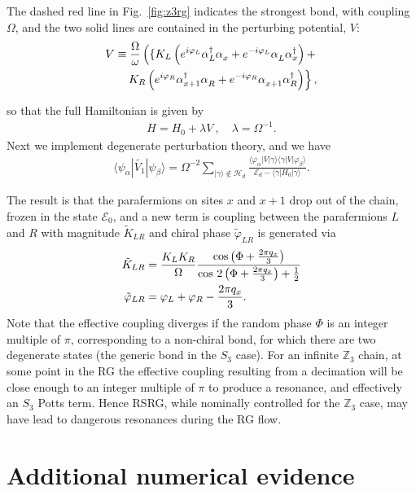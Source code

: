 \documentclass[prb,aps, twocolumn, superscriptaddress]{revtex4-1}
\newcommand{\be}{\begin{eqnarray}}
\newcommand{\ee}{\end{eqnarray}}
\newcommand{\matel}[3]{\langle #1 | #2 | #3 \rangle}
\newcommand{\pfC}[0]{\alpha^{\vphantom{\dagger}}}
\newcommand{\pfCconj}[0]{\alpha^{\dagger}}
\def\ket#1{{|#1\rangle}}
\begin{document}
\begin{appendix}
The dashed red line in Fig.~\ref{fig:z3rg} indicates the strongest bond, with coupling $\Omega$, and the two solid lines are contained in the perturbing potential, $V$: 
\begin{align} V \equiv \frac{\Omega}{\omega} \left(\{ K_L \left(e^{i \varphi_L} \pfCconj_L \pfC_x +  e^{- i \varphi_L}  \pfC_L \pfCconj_x   \right) + \right. \notag \\
\left. K_R \left( e^{i \varphi_R} \pfCconj_{x+1} \pfC_{R}+ e^{- i \varphi_R}  \pfC_{x+1} \pfCconj_R  \right) \right\}, \end{align}

so that the full Hamiltonian is given by \be H = H_0 + \lambda V~, \quad \lambda = \Omega^{-1}. \ee
Next we implement degenerate perturbation theory, and we have 
\be \matel{\psi_{\alpha}}{\tilde{V_1}}{\psi_{\beta}} = \Omega^{-2} \sum_{\ket{\gamma} \notin \mathcal{H}_d}  \frac{ \matel{\varphi_{\alpha}}{V}{\gamma} \matel{\gamma}{V}{\varphi_{\beta}} }{\mathcal{E}_d - \matel{\gamma}{H_0}{\gamma}}. \ee

The result is that the parafermions on sites $x$ and $x+1$ drop out of the chain, frozen in the state $\mathcal{E}_0$, and a new term is coupling between the parafermions $L$ and $R$ with magnitude $\tilde{K}_{LR}$ and chiral phase $\tilde{\varphi}_{LR}$ is generated via
\begin{align} \tilde{K}_{LR} &= { \frac{K_L K_R}{\Omega } \frac{ {\rm cos} \left( \Phi + \frac{2 \pi q_x}{3} \right) }{ {\rm cos~} 2\left(\Phi + \frac{2 \pi q_x}{3} \right) + \frac{1}{2} }  } \\
\tilde{\varphi}_{LR} &= { \varphi_L + \varphi_R- \frac{2 \pi q_x}{3} }.
\end{align}
Note that the effective coupling diverges if the random phase $\Phi$ is an integer multiple of $\pi$, corresponding to a non-chiral bond, for which there are two degenerate states (the generic bond in the $S_3$ case). For an infinite $\mathbb{Z}_3$ chain, at some point in the RG the effective coupling resulting from a decimation will be close enough to an integer multiple of $\pi$ to produce a resonance, and effectively an $S_3$ Potts term. Hence RSRG, while nominally controlled for the $\mathbb{Z}_3$ case, may have lead to dangerous resonances during the RG flow.





\section{Additional numerical evidence}


\end{appendix}
\end{document}
